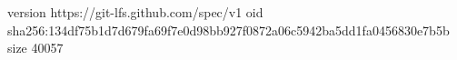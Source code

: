 version https://git-lfs.github.com/spec/v1
oid sha256:134df75b1d7d679fa69f7e0d98bb927f0872a06c5942ba5dd1fa0456830e7b5b
size 40057
